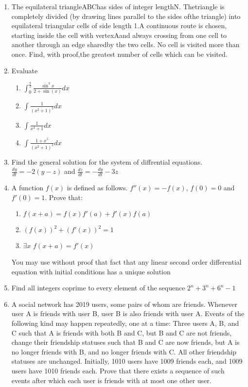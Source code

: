 \documentclass[a4paper]{article}
\begin{document}
\begin{enumerate}
	\item
	The equilateral triangleABChas sides of integer lengthN.  Thetriangle is completely divided (by drawing lines parallel to the sides ofthe triangle) into equilateral triangular cells of side length 1.A continuous route is chosen, starting inside the cell with vertexAand always crossing from one cell to another through an edge sharedby the two cells. No cell is visited more than once. Find, with proof,the greatest number of cells which can be visited.

	\item
	Evaluate
	\begin{enumerate}
	    \item 
    	$\int_{0}^{\frac{\pi}{2}} \frac{\sin^3{x}}{2 + \sin(x)} dx$

        \item
    	$\int{\frac{1}{(x^2+1)^{2}}}dx$
    	
    	\item
    	$\int{\frac{1}{x^{4}+1}}dx$
    	
    	\item
    	$\int{\frac{1+x^{5}}{(x^{2}+1)^{3}}}dx$
	\end{enumerate}

	\item
	Find the general solution for the system of diffrential equations.
	$\frac{dy}{dt} = -2(y-z)$ and $\frac{dz}{dt} = -\frac{dy}{dt} - 3z$
	
	\item
	A function $f(x)$ is defined as follows. $f''(x) = -f(x)$, $f(0) = 0$ and $f'(0) = 1$. Prove that:
	\begin{enumerate}
	    \item $f(x + a) = f(x)f'(a) + f'(x)f(a)$
	    \item $(f(x))^2 + (f'(x))^2 = 1$
	    \item $\exists x$ $f(x+a) = f'(x)$
	\end{enumerate}
	You may use without proof that fact that any linear second order differential equation with initial conditions has a unique solution
	
	\item
	Find all integers coprime to every element of the sequence $2^{n} + 3^{n} + 6^{n}-1$
	
	\item
	A social network has 2019 users, some pairs of whom are friends. Whenever user A
    is friends with user B, user B is also friends with user A. Events of the following kind may happen
    repeatedly, one at a time:
    Three users A, B, and C such that A is friends with both B and C, but B and C are
    not friends, change their friendship statuses such that B and C are now friends, but A is
    no longer friends with B, and no longer friends with C. All other friendship statuses are
    unchanged.
    Initially, 1010 users have 1009 friends each, and 1009 users have 1010 friends each. Prove that there
    exists a sequence of such events after which each user is friends with at most one other user.
    

\end{enumerate}
\end{document}
